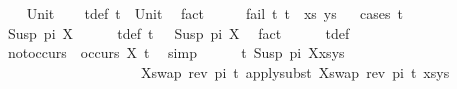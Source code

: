 \begin{isabellebody}
\isanewline
\ \ \isamarkupfalse%
\ Unit\isanewline
\ \ \isamarkupfalse%
\ t{}{\isacharunderscore}{\kern0pt}def{\isacharcolon}{\kern0pt}\ {\isachardoublequoteopen}t{}\ {\isacharequal}{\kern0pt}\ Unit{\isachardoublequoteclose}\ \isamarkupfalse%
\ fact\isanewline
\ \ \isamarkupfalse%
\ \isamarkupfalse%
\ {\isachardoublequoteopen}fail\ {\isacharparenleft}{\kern0pt}{\isacharparenleft}{\kern0pt}t{}{\isacharcomma}{\kern0pt}\ t{}{\isacharparenright}{\kern0pt}\ {\isacharhash}{\kern0pt}\ xs{\isacharcomma}{\kern0pt}\ ys{\isacharparenright}{\kern0pt}{\isachardoublequoteclose}\isanewline
\ \ \isamarkupfalse%
{\isacharparenleft}{\kern0pt}cases\ t{}{\isacharparenright}{\kern0pt}\isanewline
\ \ \ \ \isamarkupfalse%
\ {\isacharparenleft}{\kern0pt}Susp\ pi\ X{\isacharparenright}{\kern0pt}\isanewline
\ \ \ \ \isamarkupfalse%
\ t{}{\isacharunderscore}{\kern0pt}def{\isacharcolon}{\kern0pt}\ {\isachardoublequoteopen}t{}\ {\isacharequal}{\kern0pt}\ \ Susp\ pi\ X{\isachardoublequoteclose}\ \isamarkupfalse%
\ fact\isanewline
\ \ \ \ \isamarkupfalse%
\ t{}{\isacharunderscore}{\kern0pt}def\ \isamarkupfalse%
\ not{\isacharunderscore}{\kern0pt}occurs{\isacharcolon}{\kern0pt}\ {\isachardoublequoteopen}{\isasymnot}\ occurs\ X\ t{}{\isachardoublequoteclose}\ \isamarkupfalse%
\ simp\isanewline
\ \ \ \ \isamarkupfalse%
\ {\isachardoublequoteopen}{\isacharparenleft}{\kern0pt}{\isacharparenleft}{\kern0pt}t{}{\isasymapprox}{\isacharquery}{\kern0pt}\ Susp\ pi\ X{\isacharparenright}{\kern0pt}{\isacharhash}{\kern0pt}xs{\isacharcomma}{\kern0pt}ys{\isacharparenright}{\kern0pt}\ \isanewline
\ \ \ \ \ \ \ \ \ \ \ \ \ \ \ \ \ \ \ \ {\isasymturnstile}{\isacharbrackleft}{\kern0pt}{\isacharparenleft}{\kern0pt}X{\isacharcomma}{\kern0pt}swap\ {\isacharparenleft}{\kern0pt}rev\ pi{\isacharparenright}{\kern0pt}\ t{}{\isacharparenright}{\kern0pt}{\isacharbrackright}{\kern0pt}{\isasymleadsto}\ apply{\isacharunderscore}{\kern0pt}subst\ {\isacharbrackleft}{\kern0pt}{\isacharparenleft}{\kern0pt}X{\isacharcomma}{\kern0pt}swap\ {\isacharparenleft}{\kern0pt}rev\ pi{\isacharparenright}{\kern0pt}\ t{}{\isacharparenright}{\kern0pt}{\isacharbrackright}{\kern0pt}\ {\isacharparenleft}{\kern0pt}xs{\isacharcomma}{\kern0pt}ys{\isacharparenright}{\kern0pt}{\isachardoublequoteclose}\isanewline

\end{isabellebody}
